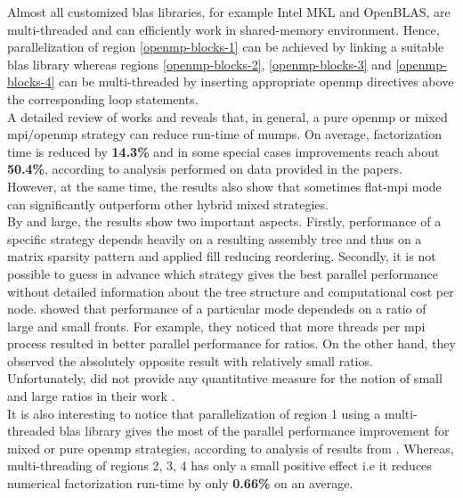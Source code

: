 Almost all customized \acrshort{blas} libraries, for example Intel MKL and OpenBLAS, are multi-threaded and can efficiently work in shared-memory environment. Hence, parallelization of region \ref{openmp-blocks-1} can be achieved by linking a suitable \acrshort{blas} library whereas regions \ref{openmp-blocks-2}, \ref{openmp-blocks-3} and \ref{openmp-blocks-4} can be multi-threaded by inserting appropriate \acrshort{openmp} directives above the corresponding loop statements.\\


A detailed review of works \cite{l2013introduction} and \cite{chowdhury2010some} reveals that, in general, a pure \acrshort{openmp} or mixed \acrshort{mpi}/\acrshort{openmp} strategy can reduce run-time of \acrshort{mumps}. On average, factorization time is reduced by \textbf{14.3\%} and in some special cases improvements reach about \textbf{50.4\%}, according to analysis performed on data provided in the papers. However, at the same time, the results also show that sometimes flat-\acrshort{mpi} mode can significantly outperform other hybrid mixed strategies.\\


By and large, the results show two important aspects. Firstly, performance of a specific strategy depends heavily on a resulting assembly tree and thus on a matrix sparsity pattern and applied fill reducing reordering. Secondly, it is not possible to guess in advance which strategy gives the best parallel performance without detailed information about the tree structure and computational cost per node. \citeauthor{l2013introduction} showed that performance of a particular mode dependeds on a ratio of large and small fronts. For example, they noticed that more threads per \acrshort{mpi} process resulted in better parallel performance for ratios. On the other hand, they observed the absolutely opposite result with relatively small ratios. Unfortunately, \citeauthor{l2013introduction} did not provide any quantitative measure for the notion of small and large ratios in their work \cite{l2013introduction}.\\ 


It is also interesting to notice that parallelization of region 1 using a multi-threaded \acrshort{blas} library gives the most of the parallel performance improvement for mixed or pure \acrshort{openmp} strategies, according to analysis of results from \cite{l2013introduction}. Whereas,
multi-threading of regions 2, 3, 4 has only a small positive effect i.e it reduces numerical factorization run-time by only \textbf{0.66\%} on an average.\\



